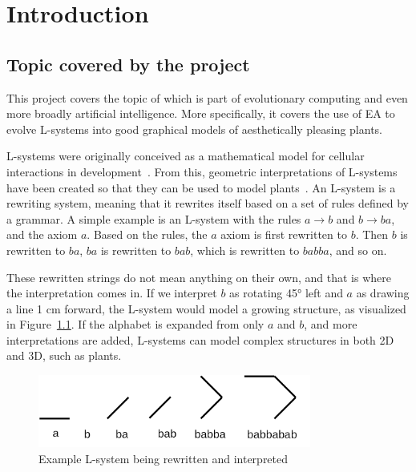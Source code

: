 \chapter{Introduction}
\label{chap:introduction}

\section{Topic covered by the project}
\label{sec:topic}

This project covers the topic of  which is part of evolutionary computing and even more broadly artificial intelligence.
More specifically, it covers the use of \gls{EA} to evolve \glspl{L-system} into good graphical models of aesthetically pleasing plants.

\glspl{L-system} were originally conceived as a mathematical model for cellular interactions in development~\cite{1968Lindenmayer-1,1968Lindenmayer-2}.
From this, geometric interpretations of L-systems have been created so that they can be used to model plants~\cite{2012Prusinkiewicz}.
An L-system is a rewriting system, meaning that it rewrites itself based on a set of rules defined by a grammar.
A simple example is an L-system with the rules $a \rightarrow b$ and $b \rightarrow ba$, and the axiom $a$.
Based on the rules, the $a$ axiom is first rewritten to $b$.
Then $b$ is rewritten to $ba$, $ba$ is rewritten to $bab$, which is rewritten to $babba$, and so on.

These rewritten strings do not mean anything on their own, and that is where the interpretation comes in.
If we interpret $b$ as rotating 45° left and $a$ as drawing a line 1 cm forward, the L-system would model a growing structure, as visualized in Figure~\ref{fig:example-l}.
If the alphabet is expanded from only $a$ and $b$, and more interpretations are added, L-systems can model complex structures in both 2D and 3D, such as plants.

\begin{figure}
    \centering
    \includegraphics[width=0.8\textwidth]{figures/lsystem}
    \caption{Example L-system being rewritten and interpreted}
    \label{fig:example-l}
\end{figure}


